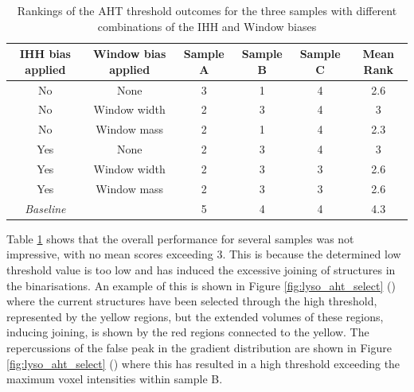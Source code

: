 \begin{table}
	\centering
	\begin{tabular}{|c|c|c|c|c|c|}
		\hline
		IHH bias applied & Window bias applied & Sample A & Sample B & Sample C & Mean Rank \\
		\hline
		No & None & 3 & 1 & 4 & 2.6 \\
		\hline
		No & Window width & 2 & 3 & 4 & 3 \\
		\hline
		No & Window mass & 2 & 1 & 4 & 2.3 \\
		\hline
		Yes & None & 2 & 3 & 4 & 3 \\
		\hline
		Yes & Window width & 2 & 3 & 3 & 2.6 \\
		\hline
		Yes & Window mass & 2 & 3 & 3 & 2.6 \\
		\hline
		\textit{Baseline} & & 5 & 4 & 4 & 4.3 \\
		\hline
	\end{tabular}
	\caption{Rankings of the AHT threshold outcomes for the three samples with different combinations of the IHH and Window biases}
	\label{tab:lyso_aht}
\end{table}
Table \ref{tab:lyso_aht} shows that the overall performance for several samples was not impressive, with no mean scores exceeding $3$. This is because the determined low threshold value is too low and has induced the excessive joining of structures in the binarisations. An example of this is shown in Figure \ref{fig:lyso_aht_select} () where the current structures have been selected through the high threshold, represented by the yellow regions, but the extended volumes of these regions, inducing joining, is shown by the red regions connected to the yellow. The repercussions of the false peak in the gradient distribution are shown in Figure \ref{fig:lyso_aht_select} () where this has resulted in a high threshold exceeding the maximum voxel intensities within sample B.\par


